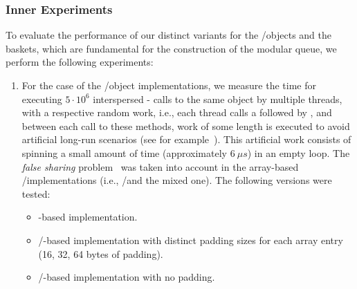 \subsubsection{\label{subsubsec:queue-experiments-inner-experiments}Inner Experiments}

To evaluate the performance of our distinct variants for the \LL/\IC objects and the baskets, which are fundamental for the construction of the modular queue, we perform the following experiments:

\begin{enumerate}
    \item For the case of the \LL/\IC object implementations, we measure the time for executing \(5 \cdot 10^6\) interspersed \LL - \IC calls to the same object by multiple threads, with a respective random work, i.e., each thread calls a \LL followed by \IC, and between each call to these methods, work of some length is executed to avoid artificial long-run scenarios (see for example~\cite{DBLP_conf_ppopp_YangM16}). This artificial work consists of spinning a small amount of time (approximately \(6\ \mu{}s\)) in an empty loop. The \emph{false sharing} problem~\cite{BoloskyMichael93} was taken into account in the array-based \LL/\IC implementations (i.e., \R/\W and the mixed one). The following versions were tested:

    \begin{itemize}
        \item \CAS-based implementation.
        \item \R/\W-based implementation with distinct padding sizes for each array entry (16, 32, 64 bytes of padding).
        \item \R/\W-based implementation with no padding.
    \end{itemize}


\end{enumerate}
